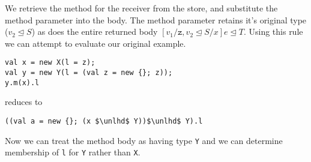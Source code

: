 \documentclass{llncs}
\numberwithin{subcase}{casethm}
\numberwithin{casethm}{theorem}
\numberwithin{casethm}{lemma}
\begin{document}
We retrieve the method for the receiver from the store, and substitute 
the method parameter into the body. The method parameter retains it's 
original type ($v_2 \unlhd S$) as does the entire returned body 
$[v_1/\texttt{z},v_2 \unlhd S/x]e \unlhd T$. Using this rule we 
can attempt to evaluate our original example.
\begin{lstlisting}[mathescape, style=custom_lang]
val x = new X(l = z);
val y = new Y(l = (val z = new {}; z));
y.m(x).l
\end{lstlisting}
reduces to
\begin{lstlisting}[mathescape, style=custom_lang]
((val a = new {}; (x $\unlhd$ Y))$\unlhd$ Y).l
\end{lstlisting}
Now we can treat the method body as having type \texttt{Y} and 
we can determine membership of \texttt{l} for \texttt{Y} rather 
than \texttt{X}.
\end{document}
